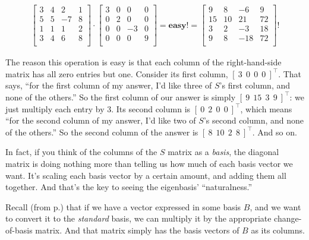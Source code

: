 \vspace{-.25in}
\begin{align*}
\begin{bmatrix}
3 & 4 & 2 & 1 \\
5 & 5 & -7 & 8 \\
1 & 1 & 1 & 2 \\
3 & 4 & 6 & 8 \\
\end{bmatrix} \cdot
\begin{bmatrix}
3 & 0 & 0 & 0 \\
0 & 2 & 0 & 0 \\
0 & 0 & -3 & 0 \\
0 & 0 & 0 & 9 \\
\end{bmatrix} = \textbf{easy!} =
\begin{bmatrix}
9 & 8 & -6 & 9 \\
15 & 10 & 21 & 72 \\
3 & 2 & -3 & 18 \\
9 & 8 & -18 & 72 \\
\end{bmatrix}\textrm{!}
\end{align*}
\vspace{-.15in}

The reason this operation is easy is that each column of the right-hand-side
matrix has all zero entries but one. Consider its first column, $[\ 3\ \ 0\ \
0\ \ 0\ ]^\intercal$. That says, ``for the first column of my answer, I'd like
three of $S$'s first column, and none of the others.'' So the first column of
our answer is simply $[\ 9\ \ 15\ \ 3\ \ 9\ ]^\intercal$: we just multiply each
entry by 3. Its second column is $[\ 0\ \ 2\ \ 0\ \ 0\ ]^\intercal$, which
means ``for the second column of my answer, I'd like two of $S$'s second
column, and none of the others.'' So the second column of the answer is $[\ 8\
\ 10\ \ 2\ \ 8\ ]^\intercal$. And so on.

In fact, if you think of the columns of the $S$ matrix as a \textit{basis}, the
diagonal matrix is doing nothing more than telling us how much of each basis
vector we want. It's scaling each basis vector by a certain amount, and adding
them all together. And that's the key to seeing the eigenbasis'
``naturalness.''


Recall (from p.\pageref{changeOfBasisMatrix}) that if we have a vector
expressed in some basis $B$, and we want to convert it to the \textit{standard}
basis, we can multiply it by the appropriate change-of-basis matrix. And that
matrix simply has the basis vectors of $B$ as its columns.


